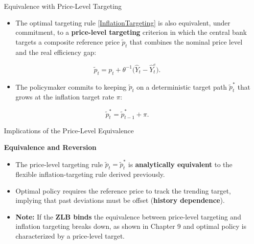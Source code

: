 \documentclass[11pt,aspectratio=169]{beamer}
\begin{document}
\begin{frame}{Equivalence with Price-Level Targeting}
\small

\begin{itemize}
  \item The optimal targeting rule \eqref{InflationTargeting} is also equivalent, under commitment, to a \textbf{price-level targeting} criterion in which the central bank targets a composite reference price $\tilde{p}_{t}$ that combines the nominal price level and the real efficiency gap:
\end{itemize}

\begin{equation*}
\tilde{p}_{t} = p_{t} + \theta^{-1}\big(\hat{Y}_{t}-\hat{Y}_{t}^{e}\big).
\end{equation*}

\begin{itemize}
  \item The policymaker commits to keeping $\tilde{p}_{t}$ on a deterministic target path $\tilde{p}_{t}^{\ast}$ that grows at the inflation target rate $\pi$:
\end{itemize}

\begin{equation*}
\tilde{p}_{t}^{\ast} = \tilde{p}_{t-1}^{\ast} + \pi.
\end{equation*}

\end{frame}


\begin{frame}{Implications of the Price-Level Equivalence}
\small

\textbf{Equivalence and Reversion}
\begin{itemize}
  \item The price-level targeting rule $\tilde{p}_{t}=\tilde{p}_{t}^{\ast }$ is \textbf{analytically equivalent} to the flexible inflation-targeting rule derived previously.
  \item Optimal policy requires the reference price to track the trending target, implying that past deviations must be offset (\textbf{history dependence}).
  \item \textbf{Note:} If the \textbf{ZLB binds} the equivalence between price-level targeting and inflation targeting breaks down, as shown in Chapter 9 and optimal policy is characterized by a price-level target.
\end{itemize}

\end{frame}
\end{document}
